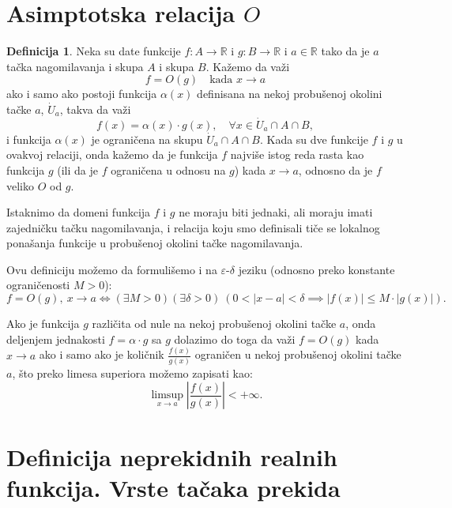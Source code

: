 \documentclass[a4paper,12pt]{article}
\theoremstyle{plain}
\theoremstyle{definition}
\newtheorem{definition}{Definicija}[section]
\theoremstyle{remark}
\begin{document}
\section{Asimptotska relacija \texorpdfstring{$O$}{O}}
\begin{definition} Neka su date funkcije $f : A \to \mathbb{R}$ i $g : B \to \mathbb{R}$ i $a \in \mathbb{R}$ tako da je $a$ tačka nagomilavanja i skupa $A$ i skupa $B$. Kažemo da važi
$$f = O(g) \quad \text{kada } x \to a$$
ako i samo ako postoji funkcija $\alpha(x)$ definisana na nekoj probušenoj okolini tačke $a$, $\dot{U}_a$, takva da važi
$$f(x) = \alpha(x) \cdot g(x), \quad \forall x \in \dot{U}_a \cap A \cap B,$$
i funkcija $\alpha(x)$ je ograničena na skupu $\dot{U}_a \cap A \cap B$.
Kada su dve funkcije $f$ i $g$ u ovakvoj relaciji, onda kažemo da je funkcija $f$ najviše istog reda rasta kao funkcija $g$ (ili da je $f$ ograničena u odnosu na $g$) kada $x \to a$, odnosno da je $f$ veliko $O$ od $g$.

\vspace{0.3cm}
Istaknimo da domeni funkcija $f$ i $g$ ne moraju biti jednaki, ali moraju imati zajedničku tačku nagomilavanja, i relacija koju smo definisali tiče se lokalnog ponašanja funkcije u probušenoj okolini tačke nagomilavanja.

Ovu definiciju možemo da formulišemo i na $\varepsilon$-$\delta$ jeziku (odnosno preko konstante ograničenosti $M > 0$):
$$f = O(g), \ x \to a \iff (\exists M > 0) (\exists \delta > 0) \ \left( 0 < |x - a| < \delta \implies |f(x)| \le M \cdot |g(x)| \right).$$

Ako je funkcija $g$ različita od nule na nekoj probušenoj okolini tačke $a$, onda deljenjem jednakosti $f = \alpha \cdot g$ sa $g$ dolazimo do toga da važi $f = O(g)$ kada $x \to a$ ako i samo ako je količnik $\frac{f(x)}{g(x)}$ ograničen u nekoj probušenoj okolini tačke $a$, što preko limesa superiora možemo zapisati kao:
$$\limsup_{x \to a} \left| \frac{f(x)}{g(x)} \right| < +\infty.$$
\end{definition}
\section{Definicija neprekidnih realnih funkcija. Vrste tačaka prekida}
\end{document}
